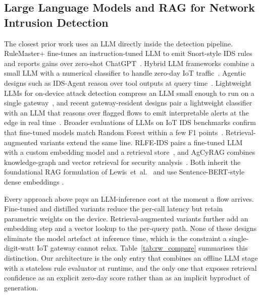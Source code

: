 \subsection{Large Language Models and RAG for Network Intrusion Detection}
\label{subsec:rw_llm_ids}

The closest prior work uses an LLM directly inside the detection
pipeline. RuleMaster+ fine-tunes an instruction-tuned LLM to emit
Snort-style IDS rules and reports gains over zero-shot
ChatGPT~\cite{lian2024rulemaster}. Hybrid LLM frameworks combine a
small LLM with a numerical classifier to handle zero-day IoT
traffic~\cite{alhammouri2025hybridllm,sensors2026hybrid_llm_iiot}. Agentic
designs such as IDS-Agent reason over tool outputs at query
time~\cite{idsagent2024}. Lightweight LLMs for on-device attack
detection compress an LLM small enough to run on a single
gateway~\cite{comcomap2025lightweight}, and recent gateway-resident
designs pair a lightweight classifier with an LLM that reasons over
flagged flows to emit interpretable alerts at the edge in real
time~\cite{jamshidi2025thinkfast}. Broader evaluations of LLMs
on IoT IDS benchmarks confirm that fine-tuned models match Random Forest
within a few F1
points~\cite{aboulela2025evaluating,iot2025llm_ecosystem_survey}.
Retrieval-augmented variants extend the same line. RLFE-IDS pairs a
fine-tuned LLM with a custom embedding model and a retrieval
store~\cite{li2025rlfeids}, and AgCyRAG combines knowledge-graph and
vector retrieval for security analysis~\cite{agcyrag2025}. Both inherit
the foundational RAG formulation of Lewis~et~al.\
\cite{lewis2020rag} and use Sentence-BERT-style dense embeddings
\cite{reimers2019sbert,song2020mpnet}.

Every approach above pays an LLM-inference cost at the moment a flow
arrives. Fine-tuned and distilled variants reduce the per-call latency
but retain parametric weights on the device. Retrieval-augmented
variants further add an embedding step and a vector lookup to the
per-query path. None of these designs eliminate the model artefact at
inference time, which is the constraint a single-digit-watt IoT gateway
cannot relax. Table~\ref{tab:rw_compare} summarises this distinction.
Our architecture is the only entry that combines an offline LLM stage
with a stateless rule evaluator at runtime, and the only one that
exposes retrieval confidence as an explicit zero-day score rather than
as an implicit byproduct of generation.

